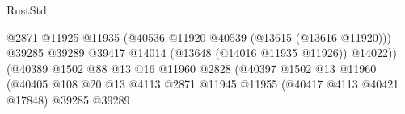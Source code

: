 \begin{lexlean}{RustStd}
\begin{coremodule}
                                                                  @2871
                                                                  @11925
                                                                  @11935
                                                                  (@40536
                                                                    @11920
                                                                    @40539
                                                                    (@13615 (@13616 @11920)))
                                                                  @39285
                                                                  @39289
                                                                  @39417
                                                                  @14014
                                                                  (@13648 (@14016 @11935 @11926))
                                                                  @14022))
                                                              (@40389
                                                                @1502
                                                                @88
                                                                @13
                                                                @16
                                                                @11960
                                                                @2828
                                                                (@40397
                                                                  @1502
                                                                  @13
                                                                  @11960
                                                                  (@40405
                                                                    @108
                                                                    @20
                                                                    @13
                                                                    @4113
                                                                    @2871
                                                                    @11945
                                                                    @11955
                                                                    (@40417 @4113 @40421 @17848)
                                                                    @39285
                                                                    @39289

\end{coremodule}
\end{lexlean}
